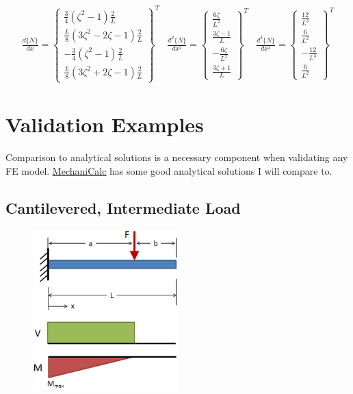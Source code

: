 \documentclass[10pt,letterpaper]{article}
\begin{document}
	\begin{align}
		\frac{d \{N\}}{d x}     =
		\begin{Bmatrix}
				\frac{3}{4} (\zeta^2-1) \frac{2}{L} \\
				\frac{L}{8} (3 \zeta^2-2 \zeta - 1) \frac{2}{L} \\
			   -\frac{3}{4} (\zeta^2-1) \frac{2}{L} \\
				\frac{L}{8} (3 \zeta^2+2 \zeta -1) \frac{2}{L}
		\end{Bmatrix}^T &
		\frac{d^2 \{N\}}{d x^2} =
		\begin{Bmatrix}
				\frac{6 \zeta}{L^2} \\
				\frac{3 \zeta-1}{L} \\
			   -\frac{6 \zeta}{L^2} \\
				\frac{3 \zeta+1}{L}
		\end{Bmatrix}^T &
		\frac{d^3 \{N\}}{d x^3} =
		\begin{Bmatrix}
				\frac{12}{L^3} \\
				\frac{6}{L^2} \\
			   -\frac{12}{L^3} \\
				\frac{6}{L^2}
		\end{Bmatrix}^T 
	\end{align}

	\section{Validation Examples}

	Comparison to analytical solutions is a necessary component when validating any FE model. \href{https://mechanicalc.com/reference/beam-deflection-tables}{\underline{MechaniCalc}} has some good analytical solutions I will compare to.

	\subsection{Cantilevered, Intermediate Load}

	\begin{figure}[H]
		\includegraphics[width=0.5\textwidth]{beam_case1_schematic.png}
	\end{figure}
\end{document}
